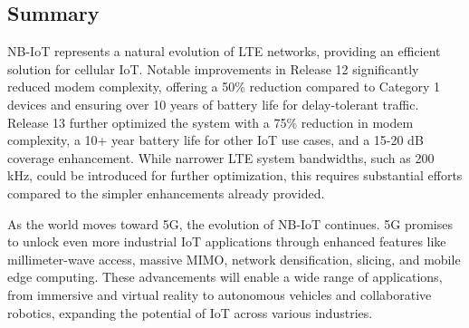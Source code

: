 \subsection{Summary}
NB-IoT represents a natural evolution of LTE networks, providing an efficient solution for cellular IoT. 
Notable improvements in Release 12 significantly reduced modem complexity, offering a 50\% reduction compared to Category 1 devices and ensuring over 10 years of battery life for delay-tolerant traffic. 
Release 13 further optimized the system with a 75\% reduction in modem complexity, a 10+ year battery life for other IoT use cases, and a 15-20 dB coverage enhancement. 
While narrower LTE system bandwidths, such as 200 kHz, could be introduced for further optimization, this requires substantial efforts compared to the simpler enhancements already provided.

As the world moves toward 5G, the evolution of NB-IoT continues. 
5G promises to unlock even more industrial IoT applications through enhanced features like millimeter-wave access, massive MIMO, network densification, slicing, and mobile edge computing. 
These advancements will enable a wide range of applications, from immersive and virtual reality to autonomous vehicles and collaborative robotics, expanding the potential of IoT across various industries.